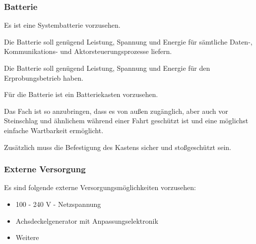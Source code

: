 \subsubsection{Batterie}
\begin{feat}
Es ist eine Systembatterie vorzusehen.
\end{feat}
\begin{rem}[zu Anf. 10]
Die Batterie soll genügend Leistung, Spannung und Energie für sämtliche Daten-, Kommunikations- und Aktorsteuerungsprozesse liefern.
\end{rem}
\begin{rem}[zu Anf. 10]
Die Batterie soll genügend Leistung, Spannung und Energie für den Erprobungsbetrieb haben.
\end{rem}
\begin{feat}
Für die Batterie ist ein Batteriekasten vorzusehen. 
\end{feat}
\begin{rem} [zu Anf. 11]
Das Fach ist so anzubringen, dass es von außen zugänglich, aber auch vor Steinschlag und ähnlichem während einer Fahrt geschützt ist und eine möglichst einfache Wartbarkeit ermöglicht.
\end{rem}
\begin{rem}
Zusätzlich muss die Befestigung des Kastens sicher und stoßgeschützt sein.
\end{rem}



\subsubsection{Externe Versorgung}
\begin{feat}
Es sind folgende externe Versorgungsmöglichkeiten vorzusehen:
\begin{itemize}
    \item 100 - 240 V - Netzspannung
    \item Achsdeckelgenerator mit Anpassungselektronik
    \item Weitere
\end{itemize}
\end{feat}



